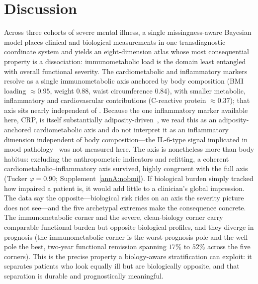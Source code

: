 \section{Discussion}

Across three cohorts of severe mental illness, a single missingness-aware Bayesian
model places clinical and biological measurements in one transdiagnostic coordinate
system and yields an eight-dimension atlas whose most consequential property is a
dissociation: immunometabolic load is the domain least entangled with overall
functional severity. The cardiometabolic and inflammatory markers resolve as a single
immunometabolic axis anchored by body composition (BMI loading $\approx 0.95$, weight
$0.88$, waist circumference $0.84$), with smaller metabolic, inflammatory and
cardiovascular contributions (C-reactive protein $\approx 0.37$); that axis sits nearly
independent of \Gfac{}. Because the one inflammatory marker available here, CRP, is itself
substantially adiposity-driven~\citep{kappelmann2021,norton2025crp}, we read this as an
adiposity-anchored cardiometabolic axis and do not interpret it as an inflammatory
dimension independent of body composition---the IL-6-type signal implicated in mood
pathology~\citep{ye2021inflammation,milaneschi2021} was not measured here. The axis is
nonetheless more than body habitus: excluding the anthropometric indicators and refitting,
a coherent cardiometabolic--inflammatory axis survived, highly congruent with the full axis
(Tucker $\varphi=0.90$; Supplement~\ref{annA:nobmi}). If biological burden simply tracked how impaired a
patient is, it would add little to a clinician's global impression. The data say the
opposite---biological risk rides on an axis the severity picture does not see---and the
five archetypal extremes make the consequence concrete. The immunometabolic corner and
the severe, clean-biology corner carry comparable functional burden but opposite
biological profiles, and they diverge in prognosis (the immunometabolic corner is the
worst-prognosis pole and the well pole the best, two-year functional remission spanning
$17\%$ to $52\%$ across the five corners). This is the precise property a
biology-aware stratification can exploit: it separates patients who look equally ill
but are biologically opposite, and that separation is durable and prognostically
meaningful.


